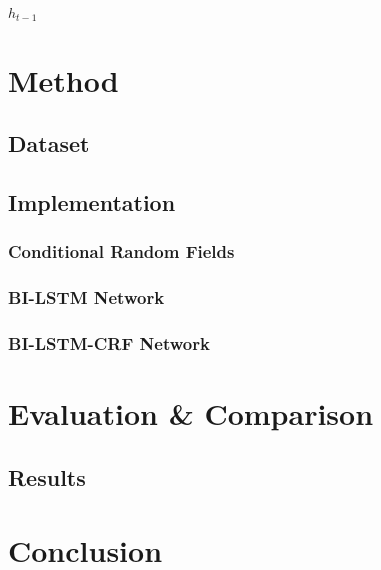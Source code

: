 \documentclass[12pt]{book}
\begin{document}
	$h_{t-1}$
	
	\chapter{Method}
	\label{chap:method}
	
	\section{Dataset}
	
	\section{Implementation}
	
	\subsection{Conditional Random Fields}
	
	\subsection{BI-LSTM Network}
	
	\subsection{BI-LSTM-CRF Network}

	\chapter{Evaluation \& Comparison}
	\label{chap:evaluation}
	
	\section{Results}

	\chapter{Conclusion}
	\label{chap:conclusion}
	
	
	
\end{document}
